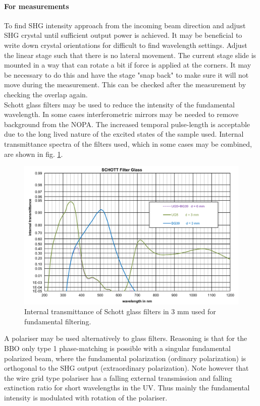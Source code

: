 \documentclass[twoside,openright]{scrreprt}
\begin{document}
\paragraph{For measurements}
To find SHG intensity approach from the incoming beam direction and adjust SHG crystal until sufficient output power is achieved. It may be beneficial to write down crystal orientations for difficult to find wavelength settings.\newline
Adjust the linear stage such that there is no lateral movement. The current stage slide is mounted in a way that can rotate a bit if force is applied at the corners. It may be necessary to do this and have the stage "snap back" to make sure it will not move during the measurement. This can be checked after the measurement by checking the overlap again.\\
Schott glass filters may be used to reduce the intensity of the fundamental wavelength. In some cases interferometric mirrors may be needed to remove background from the NOPA. The increased temporal pulse-length is acceptable due to the long lived nature of the excited states of the sample used. Internal transmittance spectra of the filters used, which in some cases may be combined, are shown in fig. \ref{fig:SchottFilters}.

\begin{figure}[hbtp]
\centering
\includegraphics[scale = 1]{images/SchottFiltersFromTool.png}
\caption{Internal transmittance of Schott glass filters in 3 mm used for fundamental filtering.\label{fig:SchottFilters}}
\end{figure}

A polariser may be used alternatively to glass filters. Reasoning is that for the BBO only type 1 phase-matching is possible with a singular fundamental polarized beam, where the fundamental polarization (ordinary polarization) is orthogonal to the SHG output (extraordinary polarization). Note however that the wire grid type polariser has a falling external transmission and falling extinction ratio for short wavelengths in the UV. Thus mainly the fundamental intensity is modulated with rotation of the polariser.
\end{document}
